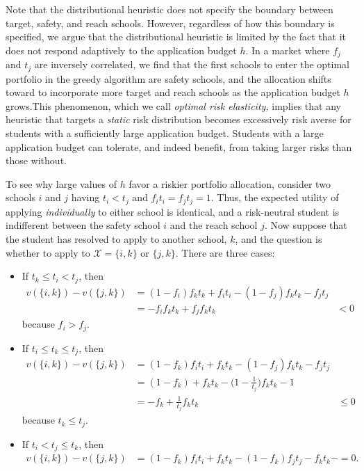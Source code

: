 Note that the distributional heuristic does not specify the boundary between target, safety, and reach schools. However, regardless of how this boundary is specified, we argue that the distributional heuristic is limited by the fact that it does not respond adaptively to the application budget $h$. In a market where $f_j$ and $t_j$ are inversely correlated, we find that the first schools to enter the optimal portfolio in the greedy algorithm are safety schools, and the allocation shifts toward to incorporate more target and reach schools as the application budget $h$ grows.This phenomenon, which we call \emph{optimal risk elasticity,} implies that any heuristic that targets a \emph{static} risk distribution becomes excessively risk averse for students with a sufficiently large application budget. Students with a large application budget can tolerate, and indeed benefit, from taking larger risks than those without.

To see why large values of $h$ favor a riskier portfolio allocation, consider two schools $i$ and $j$ having $t_i < t_j$ and $f_i t_i = f_j t_j = 1$. Thus, the expected utility of applying \emph{individually} to either school is identical, and a risk-neutral student is indifferent between the safety school $i$ and the reach school $j$. Now suppose that the student has resolved to apply to another school, $k$, and the question is whether to apply to  $\mathcal{X} = \{i, k\}$ or $\{j, k\}$. There are three cases:

\begin{itemize}
\item If $t_k \leq t_i < t_j$, then 
\begin{align*}
v(\{i, k\}) -  v(\{j, k\}) &= (1 - f_i) f_k t_k  + f_i t_i - (1 - f_j) f_k t_k - f_j t_j \\
&=  - f_i f_k t_k + f_j f_k t_k &< 0
\end{align*}
because $f_i > f_j$. 
\item If  $t_i \leq t_k \leq t_j$, then 
\begin{align*}
v(\{i, k\}) -  v(\{j, k\}) &= (1 - f_k ) f_i t_i + f_k t_k - (1 - f_j) f_k t_k - f_j t_j \\
&= (1 - f_k) + f_k t_k - \bigl( 1 - \frac{1}{t_j}\bigr) f_k t_k - 1  \\
&=  - f_k + \frac{1}{t_j} f_k t_k & \leq 0
\end{align*}
because $t_k \leq t_j$.
\item If $t_i < t_j \leq t_k$, then 
\begin{align*}
v(\{i, k\}) -  v(\{j, k\}) &=  (1 - f_k) f_i t_i + f_k t_k - (1 - f_k) f_j t_j - f_k t_k -= 0.
\end{align*}
\end{itemize}

